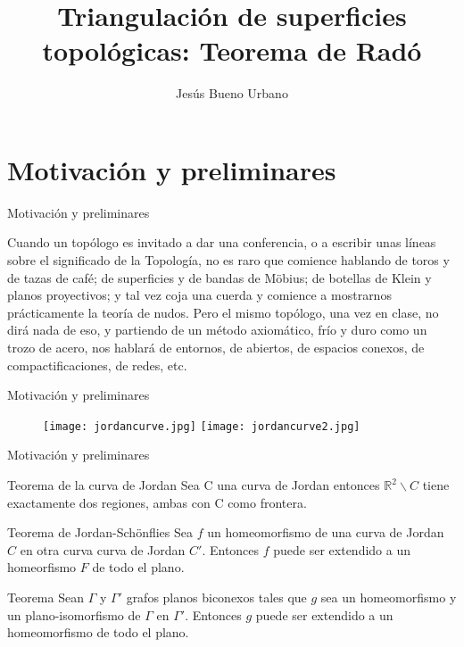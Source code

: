\documentclass{beamer}
\title[Teorema de Radó]{Triangulación de superficies\\topológicas: Teorema de Radó}
\subtitle{}
\author[Jesús Bueno]{Jesús Bueno Urbano}
\institute[Universidad de Granada]{Grado en Matemáticas\\Universidad de Granada}
\date{}
\begin{document}
\begin{frame}
  \titlepage
\end{frame}

\section*{Motivación y preliminares}

\begin{frame}{Motivación y preliminares}
	\begin{block}{}
		Cuando un topólogo es invitado a dar una conferencia, o a escribir unas líneas sobre el significado de la Topología, no es raro que comience hablando de toros y de tazas de café; de superficies y de bandas de Möbius; de botellas de Klein y planos proyectivos; y tal vez coja una cuerda y comience a mostrarnos prácticamente la teoría de nudos. Pero el mismo topólogo, una vez en clase, no dirá nada de eso, y partiendo de un método axiomático, frío y duro como un trozo de acero, nos hablará de entornos, de abiertos, de espacios conexos, de compactificaciones, de redes, etc.
	\end{block}
\end{frame}

\begin{frame}{Motivación y preliminares}
\begin{figure}[h]
\centering
\begin{minipage}[c]{\textwidth}
\centering
    \texttt{[image: jordancurve.jpg]}
    \texttt{[image: jordancurve2.jpg]}
\end{minipage}
\end{figure}
\end{frame}

\begin{frame}{Motivación y preliminares}
	\begin{block}{Teorema de la curva de Jordan}
	Sea C una curva de Jordan entonces $\mathbb{R}^2 \backslash C$ tiene exactamente dos regiones, ambas con C como frontera.
	\end{block}
	\pause
    \begin{block}{Teorema de Jordan-Schönflies}
	Sea $f$ un homeomorfismo de una curva de Jordan $C$ en otra curva curva de Jordan $C'$. Entonces $f$ puede ser extendido a un homeorfismo $F$ de todo el plano.
	\end{block}
	\pause
	\begin{block}{Teorema}
	Sean $\Gamma$ y $\Gamma'$ grafos planos biconexos tales que $g$ sea un homeomorfismo y un plano-isomorfismo de $\Gamma$ en $\Gamma'$. Entonces $g$ puede ser extendido a un homeomorfismo de todo el plano.
	\end{block}
\end{frame}
\end{document}
